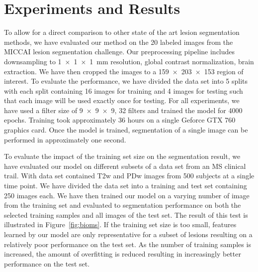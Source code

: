 %

\section{Experiments and Results}

To allow for a direct comparison to other state of the art lesion segmentation
methods, we have evaluated our method on the 20 labeled images from the MICCAI
lesion segmentation challenge. Our preprocessing pipeline includes downsampling
to \SI{1x1x1}{\milli\metre} resolution, global contrast normalization, brain
extraction. We have then cropped the images to a \num{159x203x153} region of
interest. To evaluate the performance, we have divided the data set into 5
splits with each split containing 16 images for training and 4 images for
testing such that each image will be used exactly once for testing. For all
experiments, we have used a filter size of \num{9x9x9}, 32 filters and trained
the model for 4000 epochs. Training took approximately 36 hours on a single
Geforce GTX 760 graphics card. Once the model is trained, segmentation of a
single image can be performed in approximately one second.

To evaluate the impact of the training set size on the segmentation result, we
have evaluated our model on different subsets of a data set from an MS clinical
trail. With data set contained T2w and PDw images from 500 subjects at a single
time point. We have divided the data set into a training and test set containing
250 images each. We have then trained our model on a varying number of image
from the training set and evaluated to segmentation performance on both the
selected training samples and all images of the test set. The result of this
test is illustrated in Figure~\ref{fig:bioms}. If the training set size is too
small, features learned by our model are only representative for a subset of
lesions resulting on a relatively poor performance on the test set. As the
number of training samples is increased, the amount of overfitting is reduced
resulting in increasingly better performance on the test set.

